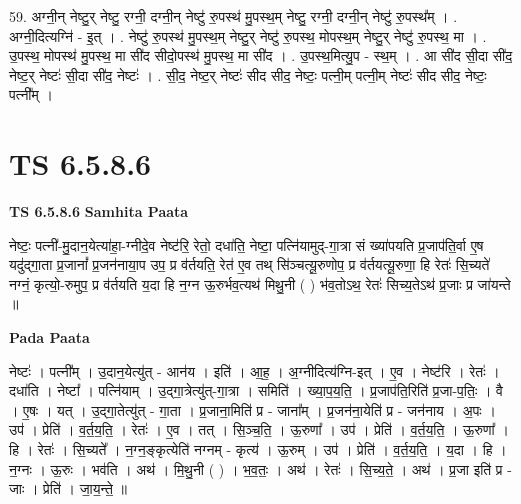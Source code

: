 \documentclass[17pt]{extarticle}
\begin{document}
59. अग्नी॒न् नेष्टु॒र् नेष्टु॒ रग्नी॒ दग्नी॒न् नेष्टु॑ रु॒पस्थ॑ मु॒पस्थ॒म् नेष्टु॒ रग्नी॒ दग्नी॒न् नेष्टु॑ रु॒पस्थ᳚म् । . अग्नी॒दित्यग्नि॑ - इ॒त् । . नेष्टु॑ रु॒पस्थ॑ मु॒पस्थ॒म् नेष्टु॒र् नेष्टु॑ रु॒पस्थ॒ मोपस्थ॒म् नेष्टु॒र् नेष्टु॑ रु॒पस्थ॒ मा । . उ॒पस्थ॒ मोपस्थ॑ मु॒पस्थ॒ मा सी॑द सीदो॒पस्थ॑ मु॒पस्थ॒ मा सी॑द । . उ॒पस्थ॒मित्यु॒प - स्थ॒म् । . आ सी॑द सी॒दा सी॑द॒ नेष्ट॒र् नेष्टः॑ सी॒दा सी॑द॒ नेष्टः॑ । . सी॒द॒ नेष्ट॒र् नेष्टः॑ सीद सीद॒ नेष्टः॒ पत्नी॒म् पत्नी॒म् नेष्टः॑ सीद सीद॒ नेष्टः॒ पत्नी᳚म् । \newline
\pagebreak
{}

\section{ TS 6.5.8.6 }

\textbf{TS 6.5.8.6 } \newline
\textbf{Samhita Paata} \newline

नेष्टः॒ पत्नी॑-मु॒दान॒येत्या॑हा॒-ग्नीदे॒व नेष्ट॑रि॒ रेतो॒ दधा॑ति॒ नेष्टा॒ पत्नि॑यामुद्-गा॒त्रा सं ख्या॑पयति प्र॒जाप॑ति॒र्वा ए॒ष यदु॑द्गा॒ता प्र॒जानां᳚ प्र॒जन॑नाया॒प उप॒ प्र व॑र्तयति॒ रेत॑ ए॒व तथ् सि॑ञ्चत्यू॒रुणोप॒ प्र व॑र्तयत्यू॒रुणा॒ हि रेतः॑ सि॒च्यते॑ नग्नं॒ कृत्यो॒-रुमुप॒ प्र व॑र्तयति य॒दा हि न॒ग्न ऊ॒रुर्भव॒त्यथ॑ मिथु॒नी ( ) भ॑व॒तोऽथ॒ रेतः॑ सिच्य॒तेऽथ॑ प्र॒जाः प्र जा॑यन्ते ॥ \newline

\textbf{Pada Paata} \newline

नेष्टः॑ । पत्नी᳚म् । उ॒दान॒येत्यु॑त् - आन॑य । इति॑ । आ॒ह॒ । अ॒ग्नीदित्य॑ग्नि-इत् । ए॒व । नेष्ट॑रि । रेतः॑ । दधा॑ति । नेष्टा᳚ । पत्नि॑याम् । उ॒द्गा॒त्रेत्यु॑त्-गा॒त्रा । समिति॑ । ख्या॒प॒य॒ति॒ । प्र॒जाप॑ति॒रिति॑ प्र॒जा-प॒तिः॒ । वै । ए॒षः । यत् । उ॒द्गा॒तेत्यु॑त् - गा॒ता । प्र॒जाना॒मिति॑ प्र - जाना᳚म् । प्र॒जन॑ना॒येति॑ प्र - जन॑नाय । अ॒पः । उप॑ । प्रेति॑ । व॒र्त॒य॒ति॒ । रेतः॑ । ए॒व । तत् । सि॒ञ्च॒ति॒ । ऊ॒रुणा᳚ । उप॑ । प्रेति॑ । व॒र्त॒य॒ति॒ । ऊ॒रुणा᳚ । हि । रेतः॑ । सि॒च्यते᳚ । न॒ग्न॒ङ्कृत्येति॑ नग्नम् - कृत्य॑ । ऊ॒रुम् । उप॑ । प्रेति॑ । व॒र्त॒य॒ति॒ । य॒दा । हि । न॒ग्नः । ऊ॒रुः । भव॑ति । अथ॑ । मि॒थु॒नी ( ) । भ॒व॒तः॒ । अथ॑ । रेतः॑ । सि॒च्य॒ते॒ । अथ॑ । प्र॒जा इति॑ प्र - जाः । प्रेति॑ । जा॒य॒न्ते॒ ॥  \newline
\end{document}
